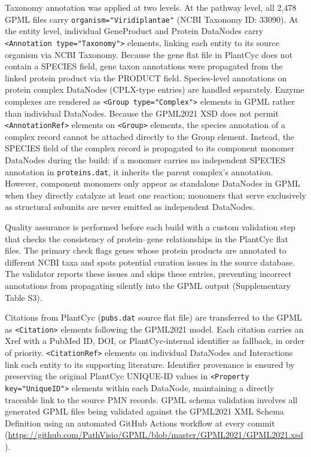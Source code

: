 \documentclass[11pt,a4paper]{article}
\begin{document}
Taxonomy annotation was applied at two levels. At the pathway level, all 2,478 GPML files carry
\texttt{organism="Viridiplantae"} (NCBI Taxonomy ID: 33090). At the entity level, individual
GeneProduct and Protein DataNodes carry \texttt{<Annotation type="Taxonomy">} elements, linking each
entity to its source organism via NCBI Taxonomy. Because the gene flat file in PlantCyc does not
contain a SPECIES field, gene taxon annotations were propagated from the linked protein product via
the PRODUCT field. Species-level annotations on protein complex DataNodes (CPLX-type entries) are
handled separately. Enzyme complexes are rendered as \texttt{<Group type="Complex">} elements in GPML
rather than individual DataNodes. Because the GPML2021 XSD does not permit \texttt{<AnnotationRef>}
elements on \texttt{<Group>} elements, the species annotation of a complex record cannot be attached
directly to the Group element. Instead, the SPECIES field of the complex record is propagated to its
component monomer DataNodes during the build: if a monomer carries no independent SPECIES annotation
in \texttt{proteins.dat}, it inherits the parent complex's annotation. However, component monomers
only appear as standalone DataNodes in GPML when they directly catalyze at least one reaction;
monomers that serve exclusively as structural subunits are never emitted as independent DataNodes.

Quality assurance is performed before each build with a custom validation step that checks the
consistency of protein--gene relationships in the PlantCyc flat files. The primary check flags genes
whose protein products are annotated to different NCBI taxa and spots potential curation issues in the
source database. The validator reports these issues and skips these entries, preventing incorrect
annotations from propagating silently into the GPML output (Supplementary Table S3).

Citations from PlantCyc (\texttt{pubs.dat} source flat file) are transferred to the GPML as
\texttt{<Citation>} elements following the GPML2021 model. Each citation carries an Xref with a PubMed
ID, DOI, or PlantCyc-internal identifier as fallback, in order of priority. \texttt{<CitationRef>}
elements on individual DataNodes and Interactions link each entity to its supporting literature.
Identifier provenance is ensured by preserving the original PlantCyc UNIQUE-ID values in
\texttt{<Property key="UniqueID">} elements within each DataNode, maintaining a directly traceable
link to the source PMN records. GPML schema validation involves all generated GPML files being
validated against the GPML2021 XML Schema Definition using an automated GitHub Actions workflow at
every commit (\url{https://github.com/PathVisio/GPML/blob/master/GPML2021/GPML2021.xsd}).
\end{document}
